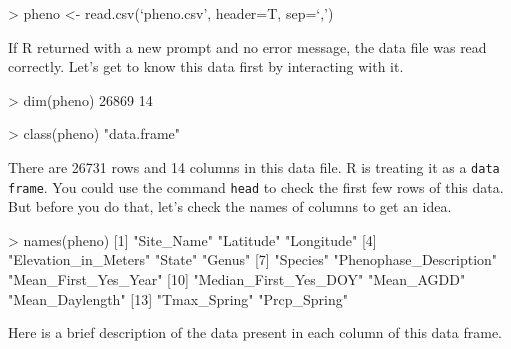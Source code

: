 \documentclass[11pt,twosided]{article}
\begin{document}
     
\begin{tcolorbox}[breakable,boxrule=0.5pt,enhanced]
\begin{code}
> pheno <- read.csv(`pheno.csv', header=T, sep=`,')
\end{code}
\end{tcolorbox}
\vspace{2ex}

If R returned with a new prompt and no error message, the data file was read correctly. Let's get to know this data first by interacting with it.\\


     
\begin{tcolorbox}[breakable,boxrule=0.5pt,enhanced]
\begin{code}
> dim(pheno)
26869	14

> class(pheno)
"data.frame"
\end{code}
\end{tcolorbox}
\vspace{2ex}

There are 26731 rows and 14 columns in this data file. R is treating it as a {\tt data frame}.  You could use the command {\tt head} to check the first few rows of this data.  But before you do that, let's check the names of columns to get an idea.\\

     
\begin{tcolorbox}[breakable,boxrule=0.5pt,enhanced]
\begin{code}
> names(pheno)
 [1] "Site_Name"              "Latitude"               "Longitude"             
 [4] "Elevation_in_Meters"    "State"                  "Genus"                 
 [7] "Species"                "Phenophase_Description" "Mean_First_Yes_Year"   
[10] "Median_First_Yes_DOY"   "Mean_AGDD"              "Mean_Daylength"        
[13] "Tmax_Spring"            "Prcp_Spring"           
\end{code}
\end{tcolorbox}
\vspace{2ex}

Here is a brief description of the data present in each column of this data frame.\\
\end{document}
